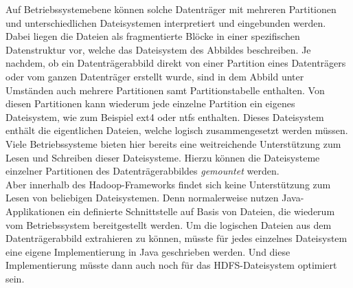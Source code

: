 \noindent
Auf Betriebssystemebene können solche Datenträger mit mehreren Partitionen und unterschiedlichen Dateisystemen interpretiert und eingebunden werden. Dabei liegen die Dateien als fragmentierte Blöcke in einer spezifischen Datenstruktur vor, welche das Dateisystem des Abbildes beschreiben. Je nachdem, ob ein Datenträgerabbild direkt von einer Partition eines Datenträgers oder vom ganzen Datenträger erstellt wurde, sind in dem Abbild unter Umständen auch mehrere Partitionen samt Partitionstabelle enthalten. 
Von diesen Partitionen kann wiederum jede einzelne Partition ein eigenes Dateisystem, wie zum Beispiel ext4 oder \acrshort{ntfs} enthalten. Dieses Dateisystem enthält die eigentlichen Dateien, welche logisch zusammengesetzt werden müssen.\\ 
Viele Betriebssysteme bieten hier bereits eine weitreichende Unterstützung zum Lesen und Schreiben dieser Dateisysteme. Hierzu können die Dateisysteme einzelner Partitionen des Datenträgerabbildes \textit{gemountet} werden.\\

\noindent
Aber innerhalb des Hadoop-Frameworks findet sich keine Unterstützung zum Lesen von beliebigen Dateisystemen. Denn normalerweise nutzen Java-Applikationen ein definierte Schnittstelle auf Basis von Dateien, die wiederum vom Betriebssystem bereitgestellt werden. Um die logischen Dateien aus dem Datenträgerabbild extrahieren zu können, müsste für jedes einzelnes Dateisystem eine eigene Implementierung in Java geschrieben werden. Und diese Implementierung müsste dann auch noch für das HDFS-Dateisystem optimiert sein.\\ 

